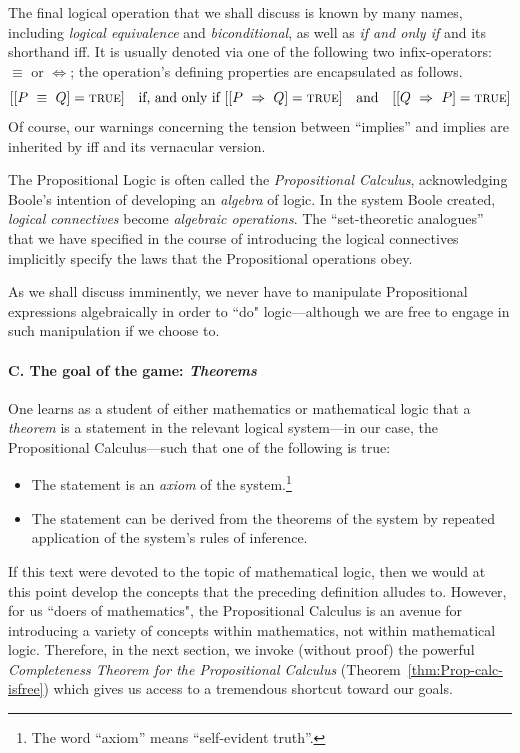 \begin{itemize}
The final logical operation that we shall discuss is known by many names, including {\it logical equivalence} and {\it biconditional}, as well as {\it if and only if} and its shorthand {\sc iff}.  It is usually denoted via one of the following two infix-operators: $\equiv$ or $\Leftrightarrow$; the operation's defining properties are encapsulated as follows.
\[ 
[[P \ \equiv \ Q] = \mbox{\sc true}]  \ \ \mbox{ if, and only if }
[[P \ \Rightarrow \ Q] = \mbox{\sc true}]  \ \ \mbox{ and } \ \
[[Q \ \Rightarrow \ P] = \mbox{\sc true}]
\]
Of course, our warnings concerning the tension between ``implies'' and {\sc implies} are inherited by {\sc iff} and its vernacular version.
\end{itemize}

\medskip

The Propositional Logic is often called the {\it Propositional Calculus}, acknowledging Boole's intention of developing an {\em algebra} of logic.  In the system Boole created, {\em logical connectives} become {\em algebraic operations}.  The ``set-theoretic analogues'' that we have specified in the course of introducing the logical connectives implicitly specify the laws that the Propositional operations obey.

\smallskip

As we shall discuss imminently, we never have to manipulate Propositional expressions algebraically in order to ``do" logic---although we are free to engage in such manipulation if we choose to.

\paragraph{C. The goal of the game: {\em Theorems}}

One learns as a student of either mathematics or mathematical logic that a {\it theorem} is a statement in the relevant logical system---in our case, the Propositional Calculus---such that one of the following is true:
\begin{itemize}
\item
The statement is an {\it axiom} of the system.\footnote{The word ``axiom'' means ``self-evident truth''.}
\item
The statement can be derived from the theorems of the system by repeated application of the system's rules of inference.
\end{itemize}
If this text were devoted to the topic of mathematical logic, then we would at this point develop the concepts that the preceding definition alludes to.  However, for us ``doers of mathematics", the Propositional Calculus is an avenue for introducing a variety of concepts within mathematics, not within mathematical logic.  Therefore, in the next section, we invoke (without proof) the powerful {\it Completeness Theorem for the Propositional Calculus} (Theorem~\ref{thm:Prop-calc-isfree}) which gives us access to a tremendous shortcut toward our goals.


